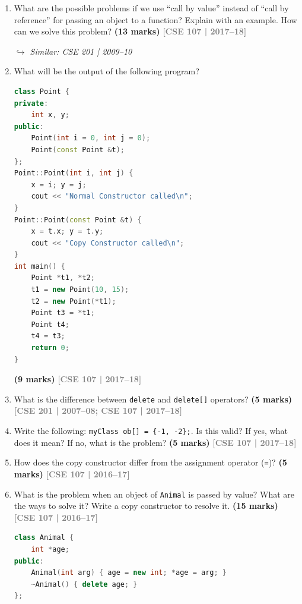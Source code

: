 \documentclass[12pt,a3paper]{article}
\newcommand{\yr}[1]{\hfill\textcolor{gray}{\small\textbf{[#1]}}}
\newcommand{\mk}[1]{\textcolor{orange!70!black}{\small\textbf{(#1 marks)}}}
\newcommand{\variant}[1]{\par\vspace{1pt}\textcolor{blue!50!black}%
  {\footnotesize\textit{$\hookrightarrow$ Similar: #1}}}
\begin{document}
\begin{enumerate}
\item What are the possible problems if we use ``call by value'' instead of ``call by reference'' for passing an object to a function? Explain with an example. How can we solve this problem? \mk{13}
\yr{CSE 107 | 2017--18}
\variant{CSE 201 | 2009--10}




\item What will be the output of the following program?
\begin{lstlisting}[language=C++]
class Point {
private:
    int x, y;
public:
    Point(int i = 0, int j = 0);
    Point(const Point &t);
};
Point::Point(int i, int j) {
    x = i; y = j;
    cout << "Normal Constructor called\n";
}
Point::Point(const Point &t) {
    x = t.x; y = t.y;
    cout << "Copy Constructor called\n";
}
int main() {
    Point *t1, *t2;
    t1 = new Point(10, 15);
    t2 = new Point(*t1);
    Point t3 = *t1;
    Point t4;
    t4 = t3;
    return 0;
}
\end{lstlisting}
\mk{9}
\yr{CSE 107 | 2017--18}





\item What is the difference between \texttt{delete} and \texttt{delete[]} operators? \mk{5}
\yr{CSE 201 | 2007--08; CSE 107 | 2017--18}





\item Write the following: \texttt{myClass ob[] = \{-1, -2\};}. Is this valid? If yes, what does it mean? If no, what is the problem? \mk{5}
\yr{CSE 107 | 2017--18}






\item How does the copy constructor differ from the assignment operator (\texttt{=})? \mk{5}
\yr{CSE 107 | 2016--17}






\item What is the problem when an object of \texttt{Animal} is passed by value? What are the ways to solve it? Write a copy constructor to resolve it. \mk{15}
\yr{CSE 107 | 2016--17}
\begin{lstlisting}[language=C++]
class Animal {
    int *age;
public:
    Animal(int arg) { age = new int; *age = arg; }
    ~Animal() { delete age; }
};
\end{lstlisting}




\end{enumerate}
\end{document}
